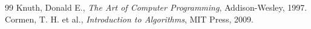 \cleardoublepage
{}
{}
\begin{thebibliography}{99}
Knuth, Donald E., \textit{The Art of Computer Programming}, Addison-Wesley, 1997.
Cormen, T. H. et al., \textit{Introduction to Algorithms}, MIT Press, 2009.
\end{thebibliography}
